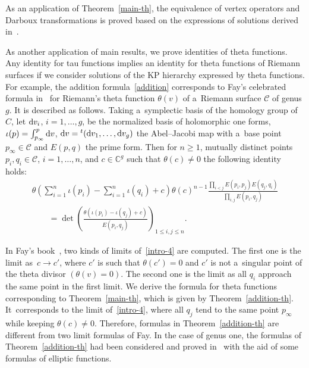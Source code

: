 \documentclass[pdftex]{sigma}
\numberwithin{equation}{section}
\theoremstyle{definition}
\begin{document}
As an application of Theorem~\ref{main-th}, the equivalence of vertex operators and Darboux transformations is
proved based on the expressions of solutions derived in~\cite{Kakei,Nak2021,Nak2024}.

As another application of main results, we prove identities of theta functions.
Any identity for tau functions implies an identity for theta functions of Riemann surfaces if we consider solutions of the KP hierarchy expressed by theta functions.
For example, the addition formula~\eqref{addition} corresponds
to Fay's celebrated formula in~\cite[equation~(43)]{Fay1973} for
 Riemann's theta function $\theta(v)$ of a~Riemann surface ${\mathcal C}$ of genus $g$. It is described as follows. Taking a~symplectic basis of the homology group of $C$, let ${\rm d}v_i$, $i=1,\dots ,g$, be the normalized basis of holomorphic one forms,
$
\iota(p)=\int_{p_\infty}^{p}{\rm d}v$, $
{\rm d}v={}^t({\rm d}v_1,\dots ,{\rm d}v_g)
$
 the Abel--Jacobi map with a~base point $p_\infty\in {\mathcal C}$ and $E(p,q)$ the prime form.
Then for $n \geq 1$, mutually distinct points $p_i, q_i\in {\mathcal C}$, $i=1,\dots ,n$, and
 $c\in {\mathbb C}^g$ such that $\theta(c)\neq 0$ the following identity holds:
\begin{gather}
\theta\left(\sum_{i=1}^n\iota(p_i)-\sum_{i=1}^n \iota(q_i)+c\right)\theta(c)^{n-1}
\frac{\prod_{i<j}E(p_i,p_j)E(q_j,q_i)}{\prod_{i,j}E(p_i,q_j)}
\nonumber
\\
\qquad=\det\left(\frac{\theta(\iota(p_i)-\iota(q_j)+c)}{E(p_i,q_j)}\right)_{1\leq i,j\leq n}.
\label{intro-4}
\end{gather}

In Fay's book~\cite{Fay1973},
two kinds of limits of~\eqref{intro-4} are computed. The first one is the limit as~${c \to c'}$, where $c'$ is such that $\theta(c')=0$ and $c'$ is not a~singular point of the theta divisor $(\theta(v)=0)$.
The second one is the limit as all $q_i$ approach the same point in the first limit.
We derive the formula for theta functions
 corresponding to Theorem~\ref{main-th}, which is given by Theorem~\ref{addition-th}.
 It~corresponds to the limit of~\eqref{intro-4}, where all $q_j$ tend to the same point $p_\infty$ while keeping $\theta(c)\neq 0$. Therefore, formulas in Theorem~\ref{addition-th} are
 different from two limit formulas of Fay.
 In the case of genus one, the formulas of Theorem~\ref{addition-th} had been considered and
 proved in~\cite{Li-Zhang2022} with the aid of some formulas of elliptic functions.
\end{document}
